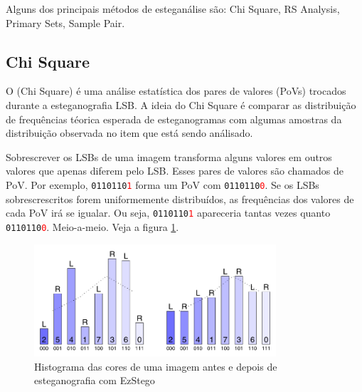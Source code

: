 Alguns dos principais métodos de esteganálise são: Chi Square, RS Analysis, Primary Sets, Sample Pair.

\subsection{Chi Square}

O \emph{\chisquare} (Chi Square) \cite{westfeld1999attacks} é uma análise estatística dos pares de valores (PoVs) trocados durante a esteganografia LSB.
A ideia do Chi Square é comparar as distribuição de frequências téorica esperada de esteganogramas com algumas amostras da distribuição observada no item que está sendo análisado.

Sobrescrever os LSBs de uma imagem transforma alguns valores em outros valores que apenas diferem pelo LSB. Esses pares de valores são chamados de PoV. Por exemplo, \texttt{0110110\textcolor{red}{1}} forma um PoV com \texttt{0110110\textcolor{red}{0}}. Se os LSBs sobrescrescritos forem uniformemente distribuídos, as frequências dos valores de cada PoV irá se igualar. Ou seja, \texttt{0110110\textcolor{red}{1}} apareceria tantas vezes quanto \texttt{0110110\textcolor{red}{0}}. Meio-a-meio. Veja a figura \ref{fig:chi-histogram}.

\begin{figure}[ht!] %
\centering
\includegraphics[width=90mm]{img/westfeld-histogram.png}
\caption{\label{fig:chi-histogram}Histograma das cores de uma imagem antes e depois de esteganografia com EzStego}
\end{figure}

